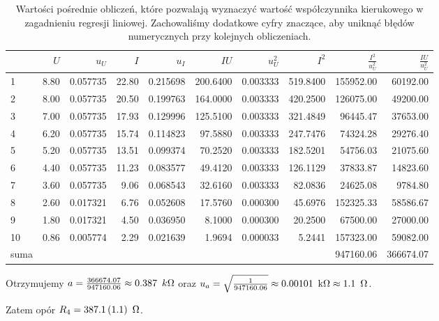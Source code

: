 \documentclass[a4paper]{article}
\begin{document}
\begin{table}
\centering
\begin{tabular}{lrrrrrrrrr}
\toprule
{} &     $U$ &       $u_U$ &      $I$ &       $u_I$ &       $IU$ &     $u_U^2$ &       $I^2$ &    $\frac{I^2}{u_U^2}$ & $\frac{IU}{u_U^2}$ \\
\midrule
1 &  8.80 &  0.057735 &  22.80 &  0.215698 &  200.6400 &  0.003333 &  519.8400 &  155952.00 &  60192.00 \\
2 &  8.00 &  0.057735 &  20.50 &  0.199763 &  164.0000 &  0.003333 &  420.2500 &  126075.00 &  49200.00 \\
3 &  7.00 &  0.057735 &  17.93 &  0.129996 &  125.5100 &  0.003333 &  321.4849 &   96445.47 &  37653.00 \\
4 &  6.20 &  0.057735 &  15.74 &  0.114823 &   97.5880 &  0.003333 &  247.7476 &   74324.28 &  29276.40 \\
5 &  5.20 &  0.057735 &  13.51 &  0.099374 &   70.2520 &  0.003333 &  182.5201 &   54756.03 &  21075.60 \\
6 &  4.40 &  0.057735 &  11.23 &  0.083577 &   49.4120 &  0.003333 &  126.1129 &   37833.87 &  14823.60 \\
7 &  3.60 &  0.057735 &   9.06 &  0.068543 &   32.6160 &  0.003333 &   82.0836 &   24625.08 &   9784.80 \\
8 &  2.60 &  0.017321 &   6.76 &  0.052608 &   17.5760 &  0.000300 &   45.6976 &  152325.33 &  58586.67 \\
9 &  1.80 &  0.017321 &   4.50 &  0.036950 &    8.1000 &  0.000300 &   20.2500 &   67500.00 &  27000.00 \\
10 &  0.86 &  0.005774 &   2.29 &  0.021639 &    1.9694 &  0.000033 &    5.2441 &  157323.00 &  59082.00 \\
\midrule
	suma & {} & {} & {} & {} & {} & {} & {} & 947160.06 & 366674.07 \\
\bottomrule
\end{tabular}
\caption{Wartości pośrednie obliczeń, które pozwalają wyznaczyć wartość współczynnika kierukowego w zagadnieniu regresji liniowej. Zachowaliśmy dodatkowe cyfry znaczące, aby uniknąć błędów numerycznych przy kolejnych obliczeniach.}
\end{table}

Otrzymujemy $a = \frac{366674.07}{947160.06} \approx 0.387 \enskip k\Omega$ oraz $u_a = \sqrt{\frac{1}{947160.06}} \approx 0.00101 \enskip \text{k}\Omega \approx 1.1 \enskip \Omega$.

Zatem opór $R_4 = 387.1 \, (1.1) \enskip \Omega$.
\end{document}
